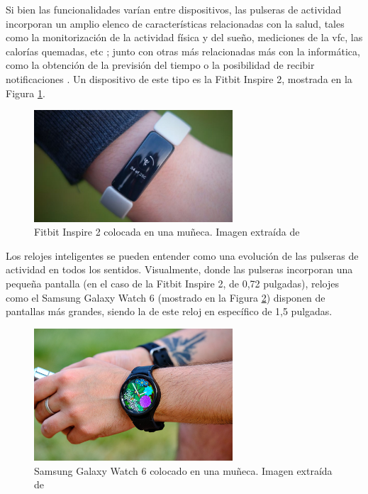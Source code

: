         Si bien las funcionalidades varían entre dispositivos, las pulseras de actividad incorporan un amplio elenco de características relacionadas con la salud, tales como la monitorización de la actividad física y del sueño, mediciones de la \gls{vfc}, las calorías quemadas, etc \cite{luque_ordonez_dispositivos_2016}; junto con otras más relacionadas más con la informática, como la obtención de la previsión del tiempo o la posibilidad de recibir notificaciones \cite{banco_santander_wearables_2022}. Un dispositivo de este tipo es la Fitbit Inspire 2, mostrada en la Figura \ref{figure:wearables:inspire_2}.

        \begin{figure}[h]
            \centering
            \includegraphics[width=0.66\textwidth]{figures/Fitbit inspire 2.jpg}
            \caption[Fitbit Inspire 2 colocada en una muñeca]
            {Fitbit Inspire 2 colocada en una muñeca. Imagen extraída de \cite{delves_fitbit_2022}}
            \label{figure:wearables:inspire_2}
        \end{figure}

        Los relojes inteligentes se pueden entender como una evolución de las pulseras de actividad en todos los sentidos. Visualmente, donde las pulseras incorporan una pequeña pantalla (en el caso de la Fitbit Inspire 2, de 0,72 pulgadas), relojes como el Samsung Galaxy Watch 6 (mostrado en la Figura \ref{figure:wearables:watch_6}) disponen de pantallas más grandes, siendo la de este reloj en específico de 1,5 pulgadas. 

        \begin{figure}[h]
            \centering
            \includegraphics[width=0.66\textwidth]{figures/Samsung galaxy watch 6.jpeg}
            \caption[Samsung Galaxy Watch 6 colocado en una muñeca]
            {Samsung Galaxy Watch 6 colocado en una muñeca. Imagen extraída de \cite{alcolea_samsung_2023}}
            \label{figure:wearables:watch_6}
        \end{figure}

